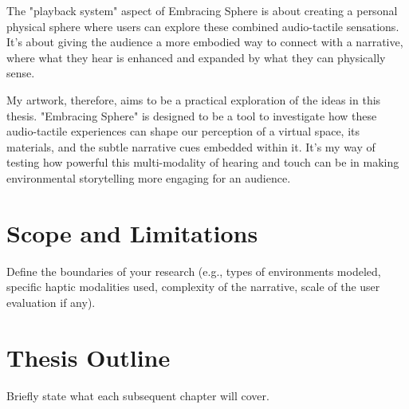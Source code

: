     The "playback system" aspect of Embracing Sphere is about creating a personal physical sphere where users can explore these combined audio-tactile sensations. It's about giving the audience a more embodied way to connect with a narrative, where what they hear is enhanced and expanded by what they can physically sense.
    
    My artwork, therefore, aims to be a practical exploration of the ideas in this thesis. "Embracing Sphere" is designed to be a tool to investigate how these audio-tactile experiences can shape our perception of a virtual space, its materials, and the subtle narrative cues embedded within it. It’s my way of testing how powerful this multi-modality of hearing and touch can be in making environmental storytelling more engaging for an audience.

    \section{Scope and Limitations} Define the boundaries of your research (e.g., types of environments modeled, specific haptic modalities used, complexity of the narrative, scale of the user evaluation if any).
    \section{Thesis Outline} Briefly state what each subsequent chapter will cover.